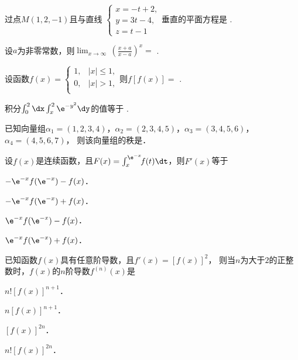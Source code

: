 \documentclass[plain,noanswer,medmath]{../../template/jnuexam}
\begin{document}




\begin{problem}
过点$M(1,2,-1)$且与直线
$\begin{cases}
  x=-t+2, \\
  y=3t-4, \\
  z=t-1
\end{cases}$垂直的平面方程是 \fillin{}.
\end{problem}


\begin{problem}
设$a$为非零常数，则$\lim_{x\to\infty}\,\left(\frac{x+a}{x-a}\right)^x=$ \fillin{}.
\end{problem}


\begin{problem}
设函数$f(x)=\begin{cases}
 1, &  |x|\le 1, \\
 0, &  |x|>1, \\
\end{cases}$则$f[f(x)]=$ \fillin{}.
\end{problem}


\begin{problem}
积分$\int_0^2\dx\int_x^2\e^{-y^2}\dy$的值等于 \fillin{}.
\end{problem}


\begin{problem}
已知向量组$\alpha_1=(1,2,3,4)$，$\alpha_2=(2,3,4,5)$，$\alpha_3=(3,4,5,6)$，$\alpha_4=(4,5,6,7)$，
则该向量组的秩是\fillin{}．　　
\end{problem}




\begin{problem}
设$f(x)$是连续函数，且$F(x)=\int_x^{\e^{-x}}\!\!f(t)\dt$，则$F'(x)$等于\pickout{}
\begin{abcd}
\item $-\e^{-x} f(\e^{-x}) - f(x)$．
\item $-\e^{-x} f(\e^{-x}) + f(x)$．
\item $\e^{-x} f(\e^{-x}) - f(x)$．
\item $\e^{-x} f(\e^{-x}) + f(x)$．
\end{abcd}
\end{problem}


\begin{problem}
已知函数$f(x)$具有任意阶导数，且$f'(x)=[f(x)]^2$，
则当$n$为大于$2$的正整数时，$f(x)$的$n$阶导数$f^{(n)}(x)$是\pickout{}
\begin{abcd}
\item $n![f(x)]^{n+1}$．
\item $n[f(x)]^{n+1}$．
\item $[f(x)]^{2n}$．
\item $n![f(x)]^{2n}$．
\end{abcd}
\end{problem}
\end{document}

